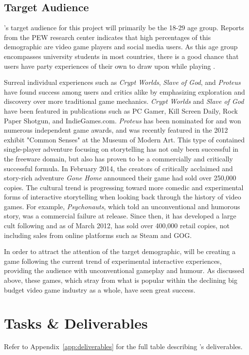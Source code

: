 \documentclass{GlobalDocument}
\begin{document}
\section{Target Audience}
\ourteam{}'s target audience for this project will primarily be the 18-29 age group. Reports from the PEW research center indicates that high percentages of this demographic are video game players and social media users. As this age group encompasses university students in most countries, there is a good chance that users have party experiences of their own to draw upon while playing \ourgame{}. 

Surreal individual experiences such as \textit{Crypt Worlds}, \textit{Slave of God}, and \textit{Proteus} have found success among users and critics alike by emphasizing exploration and discovery over more traditional game mechanics. \textit{Crypt Worlds} and \textit{Slave of God} have been featured in publications such as PC Gamer, Kill Screen Daily, Rock Paper Shotgun, and IndieGames.com. \textit{Proteus} has been nominated for and won numerous independent game awards, and was recently featured in the 2012 exhibit "Common Senses" at the Museum of Modern Art.
This type of contained single-player adventure focusing on storytelling has not only been successful in the freeware domain, but also has proven to be a commercially and critically successful formula. In February 2014, the creators of critically acclaimed and story-rich adventure \textit{Gone Home} announced their game had sold over 250,000 copies. The cultural trend is progressing toward more comedic and experimental forms of interactive storytelling when looking back through the history of video games. For example, \textit{Psychonauts}, which told an unconventional and humorous story, was a commercial failure at release. Since then, it has developed a large cult following and as of March 2012, has sold over 400,000 retail copies, not including sales from online platforms such as Steam and GOG.

In order to attract the attention of the target demographic, \ourteam{} will be creating a game following the current trend of experimental interactive experiences, providing the audience with unconventional gameplay and humour. As discussed above, these games, which stray from what is popular within the declining big budget video game industry as a whole, have seen great success.





\chapter{Tasks \& Deliverables}
Refer to Appendix~\ref{app:deliverables} for the full table describing \ourteam{}'s deliverables.
\end{document}
